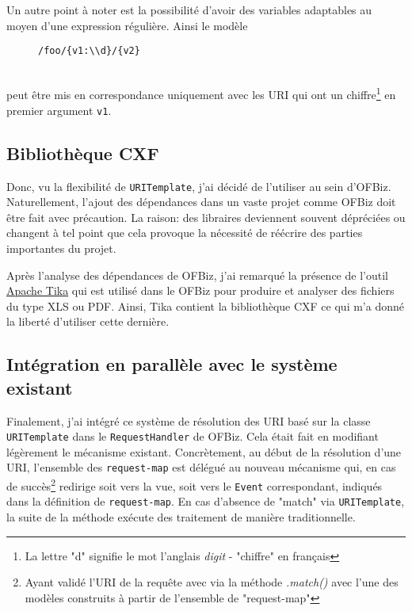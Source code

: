 Un autre point à noter est la possibilité d'avoir des variables adaptables au moyen d'une expression régulière. Ainsi le modèle 
\begin{figure}[h!]
	\begin{lstlisting}[frame=leftline]
/foo/{v1:\\d}/{v2} 
	\end{lstlisting}
\end{figure}\\
peut être mis en correspondance uniquement avec les URI qui ont un chiffre\footnote{La lettre "d" signifie le mot l'anglais \emph{digit} - "chiffre" en français} en premier argument \verb|v1|.
\subsection{Bibliothèque CXF}
Donc, vu la flexibilité de \verb|URITemplate|, j'ai décidé de l'utiliser au sein d'OFBiz.
Naturellement, l'ajout des dépendances dans un vaste projet comme OFBiz doit être fait avec précaution. La raison: des libraires deviennent souvent dépréciées ou changent à tel point que cela provoque la nécessité de réécrire des parties importantes du projet.  

Après l'analyse des dépendances de OFBiz, j'ai remarqué la présence  de l'outil \href{https://tika.apache.org/}{Apache Tika} qui est utilisé dans le OFBiz pour produire et analyser des fichiers du type XLS ou PDF. Ainsi, Tika contient la bibliothèque CXF ce qui m'a donné la liberté d'utiliser cette dernière. 

\subsection{Intégration en parallèle avec le système existant}
Finalement, j'ai intégré ce système de résolution des URI basé sur la classe \verb|URITemplate| dans le \verb|RequestHandler| de OFBiz. Cela était fait en modifiant légèrement le mécanisme existant. Concrètement, au début de la résolution d'une URI, l'ensemble des \verb|request-map| est délégué au nouveau mécanisme qui, en cas de succès\footnote{ Ayant validé l'URI de la requête avec via la méthode \emph{.match()} avec l'une des modèles construits à partir de l'ensemble de  "request-map"} redirige soit vers la vue, soit vers le \verb|Event| correspondant, indiqués dans la définition de \verb|request-map|. En cas d'absence de "match" via \verb|URITemplate|, la suite de la méthode exécute des traitement de manière traditionnelle.  


